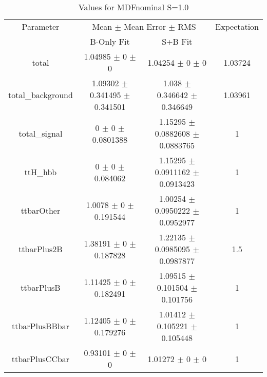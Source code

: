 \begin{table}
\centering
\caption{Values for MDFnominal S=1.0}
\begin{tabular}{cccc}
\toprule
Parameter & \multicolumn{2}{c}{Mean $\pm$ Mean Error $\pm$ RMS} & Expectation\\
 & B-Only Fit & S+B Fit & \\
\midrule
total & \num{1.04985} $\pm$ \num{0} $\pm$ \num{0} & \num{1.04254} $\pm$ \num{0} $\pm$ \num{0} & \num{1.03724}\\
total\_background & \num{1.09302} $\pm$ \num{0.341495} $\pm$ \num{0.341501} & \num{1.038} $\pm$ \num{0.346642} $\pm$ \num{0.346649} & \num{1.03961}\\
total\_signal & \num{0} $\pm$ \num{0} $\pm$ \num{0.0801388} & \num{1.15295} $\pm$ \num{0.0882608} $\pm$ \num{0.0883765} & \num{1}\\
ttH\_hbb & \num{0} $\pm$ \num{0} $\pm$ \num{0.084062} & \num{1.15295} $\pm$ \num{0.0911162} $\pm$ \num{0.0913423} & \num{1}\\
ttbarOther & \num{1.0078} $\pm$ \num{0} $\pm$ \num{0.191544} & \num{1.00254} $\pm$ \num{0.0950222} $\pm$ \num{0.0952977} & \num{1}\\
ttbarPlus2B & \num{1.38191} $\pm$ \num{0} $\pm$ \num{0.187828} & \num{1.22135} $\pm$ \num{0.0985095} $\pm$ \num{0.0987877} & \num{1.5}\\
ttbarPlusB & \num{1.11425} $\pm$ \num{0} $\pm$ \num{0.182491} & \num{1.09515} $\pm$ \num{0.101504} $\pm$ \num{0.101756} & \num{1}\\
ttbarPlusBBbar & \num{1.12405} $\pm$ \num{0} $\pm$ \num{0.179276} & \num{1.01412} $\pm$ \num{0.105221} $\pm$ \num{0.105448} & \num{1}\\
ttbarPlusCCbar & \num{0.93101} $\pm$ \num{0} $\pm$ \num{0} & \num{1.01272} $\pm$ \num{0} $\pm$ \num{0} & \num{1}\\
\bottomrule
\end{tabular}
\end{table}
